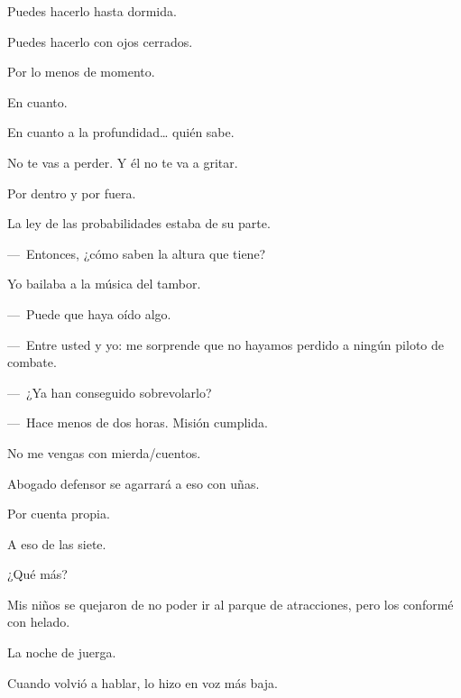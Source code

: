 \sk
Puedes hacerlo hasta dormida. 

\sk
Puedes hacerlo con ojos cerrados. 

\sk
Por lo menos de momento. 

\sk
En cuanto. 

\sk
En cuanto a la profundidad\ldots{} quién sabe. 

\sk
No te vas a perder. Y él no te va a gritar. 

\sk
Por dentro y por fuera. 

\sk
La ley de las probabilidades estaba de su parte. 


\sk
---~Entonces, ¿cómo saben la altura que tiene? 

\sk
Yo bailaba a la música del tambor. 

\sk
---~Puede que haya oído algo. 

\sk
---~Entre usted y yo: me sorprende que no hayamos perdido a ningún piloto de combate. 

\sk
---~¿Ya han conseguido sobrevolarlo? 

---~Hace menos de dos horas. Misión cumplida. 

\sk
No me vengas con mierda/cuentos. 

\sk
Abogado defensor se agarrará a eso con uñas. 

\sk
Por cuenta propia. 

\sk
A eso de las siete. 

\sk
¿Qué más? 

\sk
Mis niños se quejaron de no poder ir al parque de atracciones, pero los conformé con helado. 

\sk
La noche de juerga. 

\sk
Cuando volvió a hablar, lo hizo en voz más baja.

